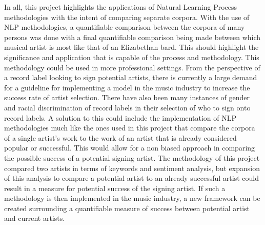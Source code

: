 \documentclass[10pt,a4paper]{article}
\begin{document}
\noindent In all, this project highlights the applications of Natural Learning Process methodologies with the intent of comparing separate corpora. With the use of NLP methodologies, a quantifiable comparison between the corpora of many persons was done with a final quantifiable comparison being made between which musical artist is most like that of an Elizabethan bard. This should highlight the significance and application that is capable of the process and methodology. This methodology could be used in more professional settings. From the perspective of a record label looking to sign potential artists, there is currently a large demand for a guideline for implementing a model in the music industry to increase the success rate of artist selection\cite{seifert}. There have also been many instances of gender and racial discrimination of record labels in their selection of who to sign onto record labels\cite{aguiar}. A solution to this could include the implementation of NLP methodologies much like the ones used in this project that compare the corpora of a single artist's work to the work of an artist that is already considered popular or successful. This would allow for a non biased approach in comparing the possible success of a potential signing artist. The methodology of this project compared two artists in terms of keywords and sentiment analysis, but expansion of this analysis to compare a potential artist to an already successful artist could result in a measure for potential success of the signing artist. If such a methodology is then implemented in the music industry, a new framework can be created surrounding a quantifiable measure of success between potential artist and current artists. 



 


\end{document}
